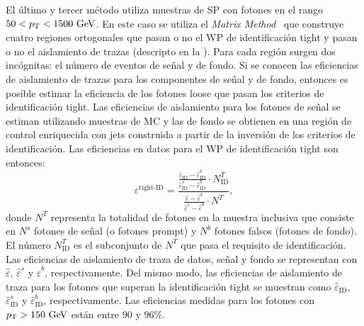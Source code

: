 El último y tercer método utiliza muestras de \ac{SP} con fotones en el rango \(50<p_{\text{T}}<1500~\text{GeV}\). En este caso se utiliza el \textit{Matrix Method}~\cite{ATLAS-EGamma-Performance-2015-2016} que construye cuatro regiones ortogonales que pasan o no el \ac{WP} de identificación tight y pasan o no el aislamiento de trazas (descripto en la \Sect{\ref{subsec:objects:egamma:iso}}). Para cada región surgen dos incógnitas: el número de eventos de señal y de fondo.
Si se conocen las eficiencias de aislamiento de trazas para los componentes de señal y de fondo, entonces es posible estimar la eficiencia de los fotones loose que pasan los criterios de identificación tight. Las eficiencias de aislamiento para los fotones de señal se estiman utilizando muestras de \ac{MC} y las de fondo se obtienen en una región de control enriquecida con jets construida a partir de la inversión de los criterios de identificación.
Las eficiencias en datos para el \ac{WP} de identificación tight son entonces:
\begin{equation*}
    \varepsilon^{\text{tight-ID}} = \frac{
        \frac{
            \hat{\varepsilon}_{\text{ID}} - \hat{\varepsilon}_{\text{ID}}^b
        }{
            \hat{\varepsilon}_{\text{ID}}^s - \hat{\varepsilon}_{\text{ID}}^b
        }
        \cdot
        N_{\text{ID}}^T
    }{
        \frac{
            \hat{\varepsilon} - \hat{\varepsilon}^b
        }{
            \hat{\varepsilon}^s - \hat{\varepsilon}^b
        }
        \cdot
        N^T
    },
\end{equation*}
donde \(N^T\) representa la totalidad de fotones en la muestra inclusiva que consiste en \(N^s\) fotones de señal (o fotones prompt) y \(N^b\) fotones falsos (fotones de fondo). El número \(N^T_{\text{ID}}\) es el subconjunto de \(N^T\) que pasa el requisito de identificación. Las eficiencias de aislamiento de traza de datos, señal y fondo se representan con \(\hat{\varepsilon}\), \(\hat{\varepsilon}^s\) y \(\hat{\varepsilon}^b\), respectivamente. Del mismo modo, las eficiencias de aislamiento de traza para los fotones que superan la identificación tight se muestran como \(\hat{\varepsilon}_{\text{ID}}\), \(\hat{\varepsilon}_{\text{ID}}^s\) y \(\hat{\varepsilon}_{\text{ID}}^b\), respectivamente. Las eficiencias medidas para los fotones con \(p_{\text{T}}>150~\text{GeV}\) están entre \(90\) y \(96\%\).





